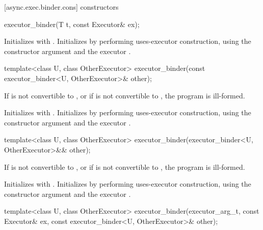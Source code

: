 [async.exec.binder.cons]{ constructors}

%
\begin{itemdecl}
executor_binder(T t, const Executor& ex);
\end{itemdecl}

\begin{itemdescr}
\pnum
\effects Initializes  with . Initializes  by performing uses-executor construction, using the constructor argument  and the executor .
\end{itemdescr}

\begin{itemdecl}
template<class U, class OtherExecutor>
  executor_binder(const executor_binder<U, OtherExecutor>& other);
\end{itemdecl}

\begin{itemdescr}
\pnum
\requires If  is not convertible to , or if  is not convertible to , the program is ill-formed.

\pnum
\effects Initializes  with . Initializes  by performing uses-executor construction, using the constructor argument  and the executor .
\end{itemdescr}

\begin{itemdecl}
template<class U, class OtherExecutor>
  executor_binder(executor_binder<U, OtherExecutor>&& other);
\end{itemdecl}

\begin{itemdescr}
\pnum
\requires If  is not convertible to , or if  is not convertible to , the program is ill-formed.

\pnum
\effects Initializes  with . Initializes  by performing uses-executor construction, using the constructor argument  and the executor .
\end{itemdescr}

\begin{itemdecl}
template<class U, class OtherExecutor>
  executor_binder(executor_arg_t, const Executor& ex,
    const executor_binder<U, OtherExecutor>& other);
\end{itemdecl}

